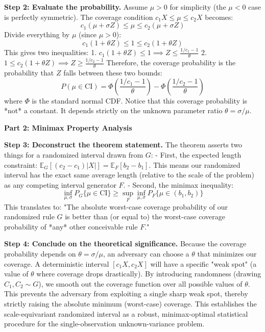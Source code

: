 \begin{solution}
\textbf{Step 2: Evaluate the probability.}
Assume $\mu > 0$ for simplicity (the $\mu < 0$ case is perfectly symmetric). The coverage condition $c_1 X \leq \mu \leq c_2 X$ becomes:
\[ c_1 (\mu + \sigma Z) \leq \mu \leq c_2 (\mu + \sigma Z) \]
Divide everything by $\mu$ (since $\mu > 0$):
\[ c_1 (1 + \theta Z) \leq 1 \leq c_2 (1 + \theta Z) \]
This gives two inequalities:
1. $c_1 (1 + \theta Z) \leq 1 \implies Z \leq \frac{1/c_1 - 1}{\theta}$
2. $1 \leq c_2 (1 + \theta Z) \implies Z \geq \frac{1/c_2 - 1}{\theta}$
Therefore, the coverage probability is the probability that $Z$ falls between these two bounds:
\[ P(\mu \in \mathrm{CI}) = \Phi\left( \frac{1/c_1 - 1}{\theta} \right) - \Phi\left( \frac{1/c_2 - 1}{\theta} \right) \]
where $\Phi$ is the standard normal CDF.
Notice that this coverage probability is *not* a constant. It depends strictly on the unknown parameter ratio $\theta = \sigma/\mu$.

\textbf{Part 2: Minimax Property Analysis}

\textbf{Step 3: Deconstruct the theorem statement.}
The theorem asserts two things for a randomized interval drawn from $G$:
- First, the expected length constraint: $\mathbb{E}_{G}[(c_2 - c_1)|X|] = \mathbb{E}_F[b_2 - b_1]$. This means our randomized interval has the exact same average length (relative to the scale of the problem) as any competing interval generator $F$.
- Second, the minimax inequality:
\[ \inf_{\mu, \sigma} P_G\{\mu \in \mathrm{CI}\} \geq \sup_F \inf_{\mu, \sigma} P_F\{\mu \in (b_1, b_2)\} \]
This translates to: "The absolute worst-case coverage probability of our randomized rule $G$ is better than (or equal to) the worst-case coverage probability of *any* other conceivable rule $F$."

\textbf{Step 4: Conclude on the theoretical significance.}
Because the coverage probability depends on $\theta = \sigma/\mu$, an adversary can choose a $\theta$ that minimizes our coverage. A deterministic interval $[c_1 X, c_2 X]$ will have a specific "weak spot" (a value of $\theta$ where coverage drops drastically).
By introducing randomness (drawing $C_1, C_2 \sim G$), we smooth out the coverage function over all possible values of $\theta$. This prevents the adversary from exploiting a single sharp weak spot, thereby strictly raising the absolute minimum (worst-case) coverage. This establishes the scale-equivariant randomized interval as a robust, minimax-optimal statistical procedure for the single-observation unknown-variance problem.
\end{solution}

